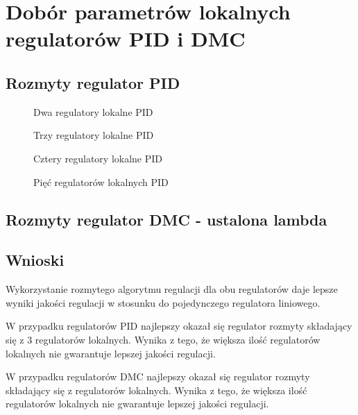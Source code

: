 \section{Dobór parametrów lokalnych regulatorów PID i DMC}
\label{projekt:zad6}


\subsection{Rozmyty regulator PID}
\label{projekt:zad6:PID}

\begin{figure}[H] 
   \centering
   
   \caption{Dwa regulatory lokalne PID}
   \label{projekt:zad6:PID:2:figure}
\end{figure}

\begin{figure}[H] 
   \centering
   
   \caption{Trzy regulatory lokalne PID}
   \label{projekt:zad6:PID:3:figure}
\end{figure}

\begin{figure}[H] 
   \centering
   
   \caption{Cztery regulatory lokalne PID}
   \label{projekt:zad6:PID:4:figure}
\end{figure}

\begin{figure}[H] 
   \centering
   
   \caption{Pięć regulatorów lokalnych PID}
   \label{projekt:zad6:PID:5:figure}
\end{figure}



\newpage

\subsection{Rozmyty regulator DMC - ustalona lambda}
\label{projekt:zad6:DMC}


\subsection{Wnioski}

Wykorzystanie rozmytego algorytmu regulacji dla obu regulatorów daje
lepsze wyniki jakości regulacji w stosunku do pojedynczego regulatora liniowego.


W przypadku regulatorów PID najlepszy okazał się regulator rozmyty składający
się z 3 regulatorów lokalnych. 
Wynika z tego, że większa ilość regulatorów
lokalnych nie gwarantuje lepszej jakości regulacji.


W przypadku regulatorów DMC najlepszy okazał się regulator rozmyty
składający się z regulatorów lokalnych. 
Wynika z tego, że większa ilość
regulatorów lokalnych nie gwarantuje lepszej jakości regulacji.
\newpage
